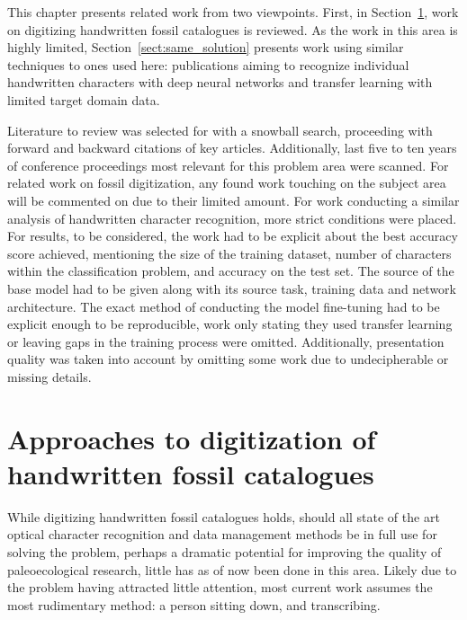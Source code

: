 \documentclass[english,twoside,openright]{UH_DS_MSc}
\begin{document}
This chapter presents related work from two viewpoints. First, in Section~\ref{sect:related_same_problem},
work on digitizing handwritten fossil catalogues is reviewed. As the work 
in this area is highly limited, Section~\ref{sect:same_solution} presents work using similar techniques 
to ones used here: publications aiming to recognize individual handwritten characters 
with deep neural networks and transfer learning with limited target domain data.


Literature to review was selected for with a snowball search, proceeding with forward and backward citations 
of key articles. Additionally, last five to ten years of conference proceedings most relevant for this problem area were 
scanned. For related work on fossil digitization, any found work touching on the subject area will be commented on due to their 
limited amount. For work conducting a similar analysis of handwritten character recognition, more strict conditions were placed. 
For results, to be considered, the work had to be explicit about the best accuracy score achieved,
mentioning the size of the training dataset, number of characters within the classification problem, and accuracy on the test set.
 The source of the base model had to be given along with its source task, training data
and network architecture. The exact method of conducting the model fine-tuning had to be explicit enough to be reproducible,
work only stating they used transfer learning or leaving gaps in the training process were omitted. Additionally, 
presentation quality was taken into account by omitting some work due to
 undecipherable or missing details.


\section{Approaches to digitization of handwritten fossil catalogues}
\label{sect:related_same_problem}

While digitizing handwritten fossil catalogues holds,
should all state of the art optical character recognition and data management methods 
be in full use for solving the problem, perhaps a dramatic potential for improving 
the quality of paleoecological research, little has as of now been done in this area.
Likely due to the problem having attracted little attention, 
most current work assumes the most rudimentary method: a person sitting down, and transcribing.
\end{document}
